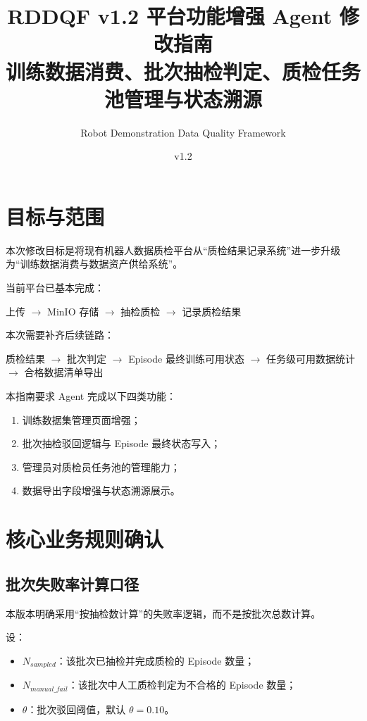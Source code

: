 \documentclass[UTF8,12pt,a4paper]{ctexart}
\title{RDDQF v1.2 平台功能增强 Agent 修改指南\\\large 训练数据消费、批次抽检判定、质检任务池管理与状态溯源}
\author{Robot Demonstration Data Quality Framework}
\date{v1.2}
\begin{document}
\maketitle
\tableofcontents
\newpage

\section{目标与范围}

本次修改目标是将现有机器人数据质检平台从“质检结果记录系统”进一步升级为“训练数据消费与数据资产供给系统”。

当前平台已基本完成：

\begin{center}
上传 $\rightarrow$ MinIO 存储 $\rightarrow$ 抽检质检 $\rightarrow$ 记录质检结果
\end{center}

本次需要补齐后续链路：

\begin{center}
质检结果 $\rightarrow$ 批次判定 $\rightarrow$ Episode 最终训练可用状态 $\rightarrow$ 任务级可用数据统计 $\rightarrow$ 合格数据清单导出
\end{center}

本指南要求 Agent 完成以下四类功能：

\begin{enumerate}
  \item 训练数据集管理页面增强；
  \item 批次抽检驳回逻辑与 Episode 最终状态写入；
  \item 管理员对质检员任务池的管理能力；
  \item 数据导出字段增强与状态溯源展示。
\end{enumerate}

\section{核心业务规则确认}

\subsection{批次失败率计算口径}

本版本明确采用“按抽检数计算”的失败率逻辑，而不是按批次总数计算。

设：

\begin{itemize}
  \item $N_{sampled}$：该批次已抽检并完成质检的 Episode 数量；
  \item $N_{manual\_fail}$：该批次中人工质检判定为不合格的 Episode 数量；
  \item $\theta$：批次驳回阈值，默认 $\theta=0.10$。
\end{itemize}
\end{document}
